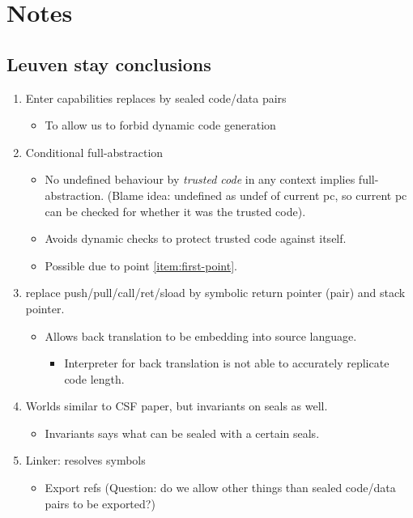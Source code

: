 \documentclass[a3paper]{article}
\begin{document}
\section{Notes}
\subsection{Leuven stay conclusions}
\begin{enumerate}
\item Enter capabilities replaces by sealed code/data pairs \label{item:first-point}
  \begin{itemize}
  \item To allow us to forbid dynamic code generation
  \end{itemize}
\item Conditional full-abstraction
  \begin{itemize}
  \item No undefined behaviour by \emph{trusted code} in any context implies full-abstraction. (Blame idea: undefined as undef of current pc, so current pc can be checked for whether it was the trusted code).
  \item Avoids dynamic checks to protect trusted code against itself.
  \item Possible due to point \ref{item:first-point}.
  \end{itemize}
\item replace push/pull/call/ret/sload by symbolic return pointer (pair) and stack pointer.
  \begin{itemize}
  \item Allows back translation to be embedding into source language.
    \begin{itemize}
    \item Interpreter for back translation is not able to accurately replicate code length.
    \end{itemize}
  \end{itemize}
\item Worlds similar to CSF paper, but invariants on seals as well.
  \begin{itemize}
  \item Invariants says what can be sealed with a certain seals.
  \end{itemize}
\item Linker: resolves symbols
  \begin{itemize}
  \item Export refs (Question: do we allow other things than sealed code/data pairs to be exported?)

\end{itemize}
\end{enumerate}
\end{document}
